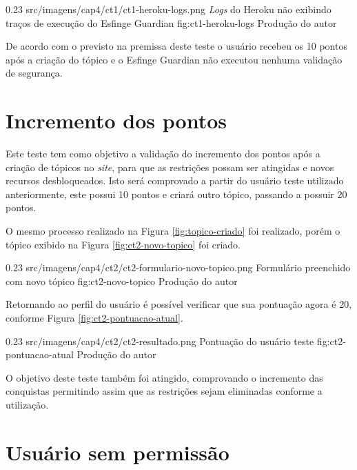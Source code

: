 \begin{image}
{0.23}
{src/imagens/cap4/ct1/ct1-heroku-logs.png}
{\textit{Logs} do Heroku não exibindo traços de execução do Esfinge Guardian}
{fig:ct1-heroku-logs}
{Produção do autor}
\end{image}

\par De acordo com o previsto na premissa deste teste o usuário recebeu os 10 pontos após a criação do tópico e o Esfinge Guardian não executou nenhuma validação de segurança.

\section{Incremento dos pontos}

\par Este teste tem como objetivo a validação do incremento dos pontos após a criação de tópicos no \textit{site}, para que as restrições possam ser atingidas e novos recursos desbloqueados. Isto será comprovado a partir do usuário teste utilizado anteriormente, este possui 10 pontos e criará outro tópico, passando a possuir 20 pontos.

\par O mesmo processo realizado na Figura \ref{fig:topico-criado} foi realizado, porém o tópico exibido na Figura \ref{fig:ct2-novo-topico} foi criado.

\begin{image}
{0.23}
{src/imagens/cap4/ct2/ct2-formulario-novo-topico.png}
{Formulário preenchido com novo tópico}
{fig:ct2-novo-topico}
{Produção do autor}
\end{image}

\par Retornando ao perfil do usuário é possível verificar que sua pontuação agora é 20, conforme Figura \ref{fig:ct2-pontuacao-atual}.

\begin{image}
{0.23}
{src/imagens/cap4/ct2/ct2-resultado.png}
{Pontuação do usuário teste}
{fig:ct2-pontuacao-atual}
{Produção do autor}
\end{image}

\par O objetivo deste teste também foi atingido, comprovando o incremento das conquistas permitindo assim que as restrições sejam eliminadas conforme a utilização.

\section{Usuário sem permissão}

